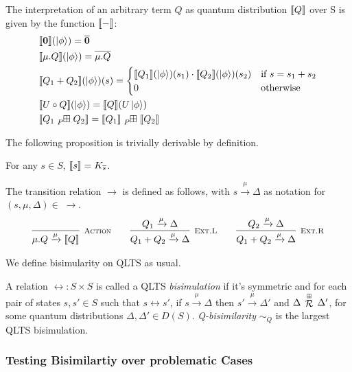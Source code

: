 The interpretation of an arbitrary term $Q$ as quantum distribution $\llbracket Q\rrbracket$ over S is given by the function $\llbracket{-}\rrbracket$:
\begin{align*}
	&\sem{\nil}(\ket{\phi}) = \overline{\nil}\\
	&\sem{\mu.Q}(\ket{\phi}) = \overline{\mu.Q}\\
	&\sem{Q_1 + Q_2}(\ket{\phi})(s) = 
	\begin{cases}
		\sem{Q_1}(\ket{\phi})(s_1) \cdot \sem{Q_2}(\ket{\phi})(s_2) & \text{if } s = s_1 + s_2\\
		0 & \text{otherwise}
	\end{cases}\\
	&\sem{U \circ Q}(\ket{\phi}) = \sem{Q}(U \ket{\phi})\\
	&\sem{Q_1 \qsum{P} Q_2} = \sem{Q_1} \qsum{P} \sem{Q_2}
\end{align*}

The following proposition is trivially derivable by definition.
\begin{proposition}
	For any $s \in S$, $\llbracket s\rrbracket = K_{\overline{s}}$.
\end{proposition}

The transition relation $\to$ is defined as follows, with $s \xrightarrow{\mu} \Delta$ as notation for $(s, \mu, \Delta) \in\;\to$.
\begin{gather*}
  \infer[\mbox{\footnotesize\scshape Action}]{\mu.Q \xrightarrow{\mu} \sem{Q}}{} \qquad 
  \infer[\mbox{\footnotesize\scshape Ext.L}]{Q_1 + Q_2 \xrightarrow{\mu} \Delta}{Q_1 \xrightarrow{\mu} \Delta} \qquad
  \infer[\mbox{\footnotesize\scshape Ext.R}]{Q_1 + Q_2 \xrightarrow{\mu} \Delta}{Q_2 \xrightarrow{\mu} \Delta}
\end{gather*}

We define bisimularity on QLTS as usual.
\begin{definition}
	A relation $\rel : S \times S$ is called a QLTS \emph{bisimulation} if it's symmetric and for each pair of states $s, s' \in S$ such that $s \rel s'$,
	if $s \xrightarrow{\mu} \Delta$ then $s' \xrightarrow{\mu} \Delta'$ and $\Delta\,\stackrel{\scriptscriptstyle \boxplus}{\mathcal{R}}\,\Delta'$, for some quantum distributions $\Delta, \Delta' \in D(S)$.
	\emph{Q-bisimilarity} $\sim_Q$ is the largest QLTS bisimulation.
\end{definition}


\subsubsection{Testing Bisimilartiy over problematic Cases}

